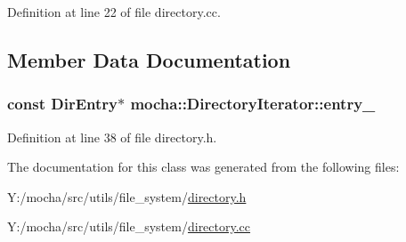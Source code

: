 Definition at line 22 of file directory.cc.



\subsection{Member Data Documentation}
\hypertarget{classmocha_1_1_directory_iterator_a91d06f432f427c12545b628a11286688}{
\subsubsection[{entry\_\-}]{\setlength{\rightskip}{0pt plus 5cm}const {\bf DirEntry}$\ast$ {\bf mocha::DirectoryIterator::entry\_\-}}}
\label{classmocha_1_1_directory_iterator_a91d06f432f427c12545b628a11286688}


Definition at line 38 of file directory.h.



The documentation for this class was generated from the following files:\begin{DoxyCompactItemize}
\item 
Y:/mocha/src/utils/file\_\-system/\hyperlink{directory_8h}{directory.h}\item 
Y:/mocha/src/utils/file\_\-system/\hyperlink{directory_8cc}{directory.cc}\end{DoxyCompactItemize}
